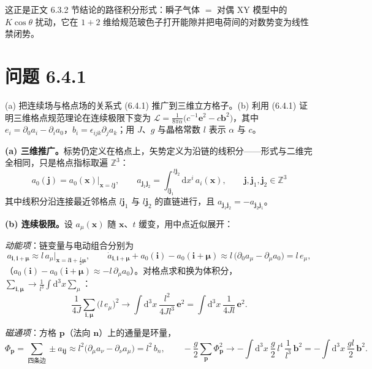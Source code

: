 这正是正文 6.3.2 节结论的路径积分形式：瞬子气体 $=$ 对偶 XY 模型中的 $K\cos\theta$ 扰动，它在 $1+2$ 维给规范玻色子打开能隙并把电荷间的对数势变为线性禁闭势。
\section*{问题 6.4.1}
\begin{problem}
(a) 把连续场与格点场的关系式 (6.4.1) 推广到三维立方格子。(b) 利用 (6.4.1) 证明三维格点规范理论在连续极限下变为 $\mathcal{L}=\frac{1}{8\pi\alpha}\bigl(c^{-1}\pmb e^{2}-c\pmb b^{2}\bigr)$，其中 $e_i=\partial_0a_i-\partial_ia_0$，$b_i=\epsilon_{ijk}\partial_ja_k$；用 $J$、$g$ 与晶格常数 $l$ 表示 $\alpha$ 与 $c$。
\end{problem}
\solution

\textbf{(a) 三维推广。}标势仍定义在格点上，矢势定义为沿链的线积分——形式与二维完全相同，只是格点指标取遍 $\mathbb{Z}^{3}$：
\begin{equation*}
\boxed{\ a_0(\pmb j)=a_0(\pmb x)\big|_{\pmb x=l\pmb j},
\qquad
a_{\pmb j_1\pmb j_2}=\int_{l\pmb j_1}^{\,l\pmb j_2}\mathrm{d}x^{i}\,a_i(\pmb x),\qquad
\pmb j,\pmb j_1,\pmb j_2\in\mathbb{Z}^{3}\ }
\end{equation*}
其中线积分沿连接最近邻格点 $l\pmb j_1$ 与 $l\pmb j_2$ 的直链进行，且 $a_{\pmb j_1\pmb j_2}=-a_{\pmb j_2\pmb j_1}$。

\textbf{(b) 连续极限。}设 $a_\mu(\pmb x)$ 随 $\pmb x$、$t$ 缓变，用中点近似展开：

\emph{动能项}：链变量与电动组合分别为
\begin{equation*}
a_{\pmb i,\pmb i+\pmb\mu}\approx l\,a_\mu\Big|_{\pmb x=l\pmb i+\frac{l}{2}\pmb\mu},
\qquad
\dot a_{\pmb i,\pmb i+\pmb\mu}+a_0(\pmb i)-a_0(\pmb i+\pmb\mu)
\approx l\,\bigl(\partial_0a_\mu-\partial_\mu a_0\bigr)
=l\,e_\mu ,
\end{equation*}
（$a_0(\pmb i)-a_0(\pmb i+\pmb\mu)\approx-l\,\partial_\mu a_0$）。对格点求和换为体积分，$\sum_{\pmb i,\pmb\mu}\to\frac{1}{l^{3}}\int\mathrm{d}^{3}x\sum_{\mu}$：
\begin{equation*}
\frac{1}{4J}\sum_{\pmb i,\pmb\mu}\bigl(l\,e_\mu\bigr)^{2}
\longrightarrow
\int\mathrm{d}^{3}x\ \frac{l^{2}}{4Jl^{3}}\,\pmb e^{2}
=\int\mathrm{d}^{3}x\ \frac{1}{4Jl}\,\pmb e^{2} .
\end{equation*}

\emph{磁通项}：方格 $\pmb p$（法向 $\pmb n$）上的通量是环量，
\begin{equation*}
\Phi_{\pmb p}=\sum_{\text{四条边}}\pm a_{\pmb i\pmb j}
\approx l^{2}\bigl(\partial_\mu a_\nu-\partial_\nu a_\mu\bigr)
=l^{2}\,b_{n} ,
\qquad
-\frac{g}{2}\sum_{\pmb p}\Phi_{\pmb p}^{2}
\longrightarrow
-\int\mathrm{d}^{3}x\ \frac{g}{2}\,l^{4}\,\frac{1}{l^{3}}\,\pmb b^{2}
=-\int\mathrm{d}^{3}x\ \frac{gl}{2}\,\pmb b^{2} .
\end{equation*}


